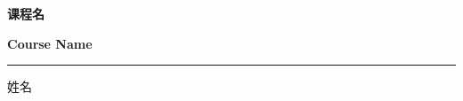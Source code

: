 \documentclass{report}
\begin{document}
\begin{titlepage}
    \centering
    \vspace*{5cm}
    {\sffamily\Huge\bfseries 课程名\par}
    \vspace{0.5cm}
	{\sffamily\Large\bfseries Course Name\par}
    \vspace{2cm}
    \rule{0.8\linewidth}{0.4pt}
    \vspace{5cm}
	
    {\kaishu\Large 姓名\par}
    \vfill
\end{titlepage}

\newpage%
\tableofcontents
\pagebreak


\end{document}
